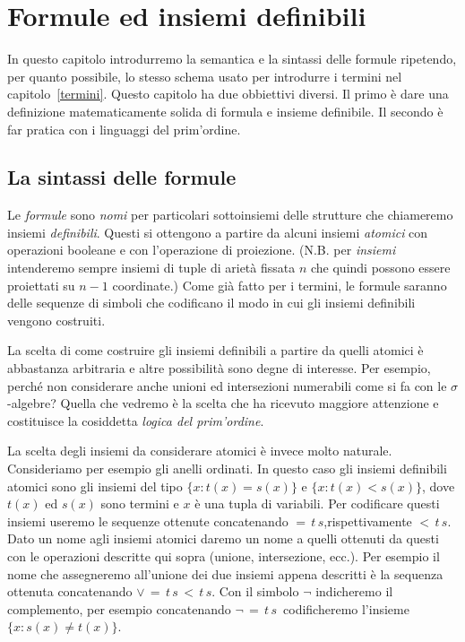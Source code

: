 \chapter{Formule ed insiemi definibili}\label{formule}

In questo capitolo introdurremo la semantica e la sintassi delle formule ripetendo, per quanto possibile, lo stesso schema usato per introdurre i termini nel capitolo~\ref{termini}. Questo capitolo ha due obbiettivi diversi. Il primo \`e dare una definizione matematicamente solida di formula e insieme definibile. Il secondo \`e far pratica con i linguaggi del prim'ordine.

\section{La sintassi delle formule}\label{sintassformule}

Le \emph{formule} sono \textit{nomi\/} per particolari sottoinsiemi delle strutture che chiameremo insiemi \emph{definibili}. Questi si ottengono a partire da alcuni insiemi \textit{atomici\/} con operazioni booleane e con l'operazione di proiezione. (N.B. per \textit{insiemi\/} intenderemo sempre insiemi di tuple di ariet\`a fissata $n$ che quindi possono essere proiettati su $n-1$ coordinate.) Come gi\`a fatto per i termini, le formule saranno delle sequenze di simboli che codificano il modo in cui gli insiemi definibili vengono costruiti.

La scelta di come costruire gli insiemi definibili a partire da quelli atomici \`e abbastanza arbitraria e altre possibilit\`a sono degne di interesse. Per esempio, perch\'e non considerare anche unioni ed intersezioni numerabili come si fa con le $\sigma$-algebre? Quella che vedremo \`e la scelta che ha ricevuto maggiore attenzione e costituisce la cosiddetta \emph{logica del prim'ordine}.

La scelta degli insiemi da considerare atomici \`e invece molto naturale. Consideriamo per esempio gli anelli ordinati. In questo caso gli insiemi definibili atomici sono gli insiemi del tipo $\{x:t(x)=s(x)\}$ e $\{x:t(x)<s(x)\}$, dove $t(x)$ ed $s(x)$ sono termini e $x$ \`e una tupla di variabili. Per codificare questi insiemi useremo le sequenze ottenute concatenando $=\,t\,s$,rispettivamente ${<}\,t\,s$. Dato un nome agli insiemi atomici daremo un nome a quelli ottenuti da questi con le operazioni descritte qui sopra (unione, intersezione, ecc.). Per esempio il nome che assegneremo all'unione dei due insiemi appena descritti \`e la sequenza ottenuta concatenando ${\vee}\,{=}\,t\,s\,{<}\,t\,s$. Con il simbolo $\neg$ indicheremo il complemento, per esempio concatenando ${\neg}\,{=}\,t\,s$\ codificheremo l'insieme $\{x:s(x)\neq t(x)\}$.

